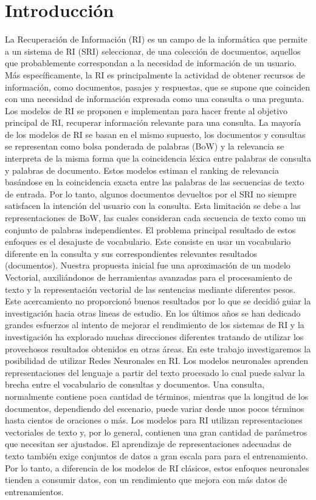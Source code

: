 \documentclass{llncs}
\begin{document}
\section{Introducción}
%
La Recuperación de Información (RI) es un campo de la informática que permite a un sistema de RI (SRI) seleccionar, de una colección de documentos, aquellos que probablemente correspondan a la necesidad de información de un usuario. Más específicamente, la RI es principalmente la actividad de obtener recursos de información, como documentos, pasajes y respuestas, que se supone que coinciden con una necesidad de información expresada como una consulta o una pregunta.
Los modelos de RI se proponen e implementan para hacer frente al objetivo principal de RI, recuperar información relevante para una consulta. La mayoría de los modelos de RI se basan en el mismo supuesto, los documentos y consultas se representan como bolsa ponderada de palabras (BoW) y la relevancia se interpreta de la misma forma que la coincidencia léxica entre palabras de consulta y palabras de documento. Estos modelos estiman el ranking de relevancia basándose en la coincidencia exacta entre las palabras de las secuencias de texto de entrada. Por lo tanto, algunos documentos devueltos por el SRI no siempre satisfacen la intención del usuario con la consulta. Esta limitación se debe a las representaciones de BoW, las cuales consideran cada secuencia de texto como un conjunto de palabras independientes. El problema principal resultado de estos enfoques es el desajuste de vocabulario. Este consiste en usar un vocabulario diferente en la consulta y sus correspondientes relevantes resultados (documentos).
Nuestra propuesta inicial fue una aproximación de un modelo Vectorial, auxiliándonos de herramientas avanzadas para el procesamiento de texto y la representación vectorial de las sentencias mediante diferentes pesos. Este acercamiento no proporcionó buenos resultados por lo que se decidió guiar la investigación hacia otras lineas de estudio.
En los últimos años se han dedicado grandes esfuerzos al intento de mejorar el rendimiento de los sistemas de RI y la investigación ha explorado muchas direcciones diferentes tratando de utilizar los provechosos resultados obtenidos en otras áreas. En este trabajo investigaremos la posibilidad de utilizar Redes Neuronales en RI. 
Los modelos neuronales aprenden representaciones del lenguaje a partir del texto procesado lo cual puede salvar la brecha entre el vocabulario de consultas y documentos. Una consulta, normalmente contiene poca cantidad de términos, mientras que la longitud de los documentos, dependiendo del escenario, puede variar desde unos pocos términos hasta cientos de oraciones o más. Los modelos para RI utilizan representaciones vectoriales de texto y, por lo general, contienen una gran cantidad de parámetros que necesitan ser ajustados. El aprendizaje de representaciones adecuadas de texto también exige conjuntos de datos a gran escala para para el entrenamiento. Por lo tanto, a diferencia de los modelos de RI clásicos, estos enfoques neuronales tienden a consumir datos, con un rendimiento que mejora con más datos de entrenamientos.
\end{document}

